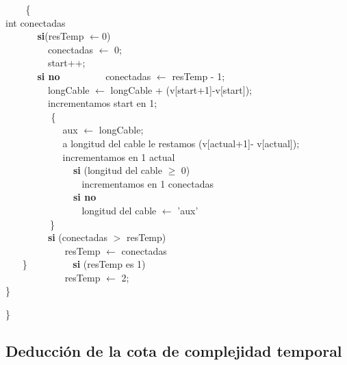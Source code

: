$~~~~~~~~$ \{  \\
		int conectadas \\
$~~~~~~~~~~~~~~~$\textbf{si}(resTemp $\leftarrow$0)   \\
$~~~~~~~~~~~~~~~~~~~~$conectadas  $\leftarrow$ 0; \\
$~~~~~~~~~~~~~~~~~~~~$start++; \\
$~~~~~~~~~~~~~~~$\textbf{si no}
$~~~~~~~~~~~~~~~~~~~~$conectadas $\leftarrow$ resTemp - 1;\\ 
$~~~~~~~~~~~~~~~~~~~~$longCable $\leftarrow$ longCable + (v[start+1]-v[start]);\\
$~~~~~~~~~~~~~~~~~~~~$incrementamos start en 1;  \\
$~~~~~~~~~~~~~~~~~~~~$ \{  \\
$~~~~~~~~~~~~~~~~~~~~~~~~~~~$aux $\leftarrow$ longCable; \\
$~~~~~~~~~~~~~~~~~~~~~~~~~~~$a longitud del cable  le restamos (v[actual+1]- v[actual]); \\
$~~~~~~~~~~~~~~~~~~~~~~~~~~~$incrementamos en 1 actual \\
$~~~~~~~~~~~~~~~~~~~~~~~~~~~~~~~~$\textbf{si} (longitud del cable $\geq$ 0)  \\
$~~~~~~~~~~~~~~~~~~~~~~~~~~~~~~~~~~~~$incrementamos en 1 conectadas \\
$~~~~~~~~~~~~~~~~~~~~~~~~~~~~~~~~$\textbf{si no} \\
$~~~~~~~~~~~~~~~~~~~~~~~~~~~~~~~~~~~~$longitud del cable $\leftarrow$ 'aux' \\
$~~~~~~~~~~~~~~~~~~~~~$\} \\
$~~~~~~~~~~~~~~~~~~~~$\textbf{si} (conectadas $>$ resTemp)\\
$~~~~~~~~~~~~~~~~~~~~~~~~~~~~$resTemp $\leftarrow$ conectadas\\
$~~~~~~~~$\}
$~~~~~~~~~~~~~~~~~~~~$\textbf{si} (resTemp es 1)\\
$~~~~~~~~~~~~~~~~~~~~~~~~~~~~$resTemp $\leftarrow$ 2;\\
\}




\}\\

\subsection{Deducción de la cota de complejidad temporal}


